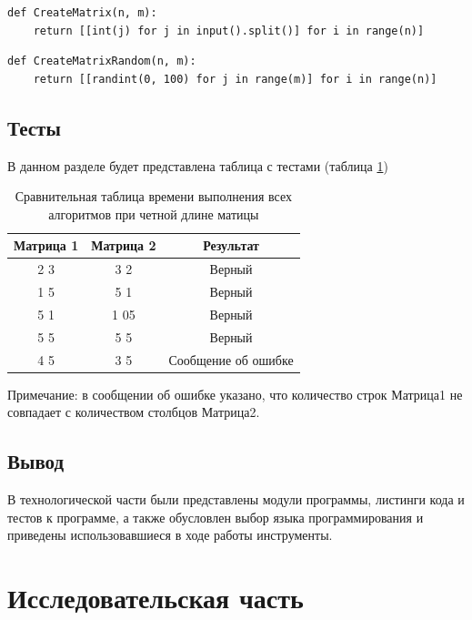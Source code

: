 \documentclass[12pt]{report}
\begin{document}
\begin{lstlisting}[label=some-code,caption=Подпрограмма создания матрицы]
def CreateMatrix(n, m):
    return [[int(j) for j in input().split()] for i in range(n)]
\end{lstlisting}

\begin{lstlisting}[label=some-code,caption=Подпрограмма создания матрицы с использованием функции randint модуля random  \cite{bib4}]
def CreateMatrixRandom(n, m):
    return [[randint(0, 100) for j in range(m)] for i in range(n)]\end{lstlisting}

\section{Тесты}

В данном разделе будет представлена таблица с тестами (таблица \ref{table:ref13})
\begin{table}[ht]
	\centering
	\caption{Сравнительная таблица времени выполнения всех алгоритмов при четной длине матицы}
	\begin{tabular}{|c c c|}
		\hline
		Матрица 1 & Матрица 2 &  Результат \\ [0.5ex] 
 		\hline\hline
		2 3 & 3 2 & Верный\\
 		\hline
 		1 5 & 5 1 & Верный\\
		\hline
		5 1 & 1 05 & Верный\\
 		\hline
 		 5 5 & 5 5 & Верный\\
 		\hline
		4 5 & 3 5 & Сообщение об ошибке\\
		\hline
	\end{tabular}
	\label{table:ref13}
\end{table} 

Примечание: в сообщении об ошибке указано, что количество строк Матрица1 не совпадает с количеством столбцов Матрица2.


\section{Вывод}
В технологической части были представлены модули программы, листинги кода и тестов к программе, а также обусловлен выбор языка программирования и приведены использовавшиеся в ходе работы инструменты.


\chapter{Исследовательская часть}
\end{document}
